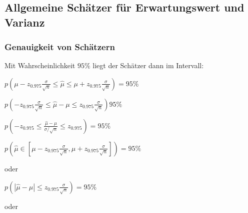 \documentclass[8pt,a4paper]{scrartcl}
\begin{document}
\begin{multicols*}{3}
\subsection{Allgemeine Schätzer für Erwartungswert und Varianz}




\subsubsection{Genauigkeit von Schätzern}



Mit Wahrscheinlichkeit $95\%$ liegt der Schätzer dann im Intervall:

$p\left(\mu-z_{0.975}\frac{\sigma}{\sqrt{n}}\leq\hat{\mu}\leq \mu+z_{0.975}\frac{\sigma}{\sqrt{n}}\right)=95\%$

$p\left(-z_{0.975}\frac{\sigma}{\sqrt{n}}\leq \hat{\mu}-\mu\leq z_{0.975}\frac{\sigma}{\sqrt{n}}\right)95\%$

$p\left(-z_{0.975}\leq\frac{\hat{\mu}-\mu}{\sigma/\sqrt{n}}\leq z_{0.975}\right)=95\%$

$p\left(\hat{\mu}\in[\mu-z_{0.975}\frac{\sigma}{\sqrt{n}},\mu+z_{0.975}\frac{\sigma}{\sqrt{n}}]\right)=95\%$

oder

$p\left(|\hat{\mu}-\mu|\leq z_{0.975}\frac{\sigma}{\sqrt{n}}\right)=95\%$

oder


\end{multicols*}
\end{document}
